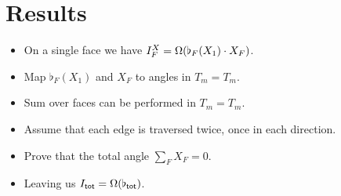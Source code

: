 \section{Results}


\begin{frame}
\begin{itemize}
\item On a single face we have \( I^X_F=\Omega(\flat_F(X_1)\cdot X_F) \).
\item Map \( \flat_F(X_1) \) and \( X_F \) to angles in \( T_m=T_m \).
\item Sum over faces can be performed in \( T_m=T_m \).
\item Assume that each edge is traversed twice, once in each direction.
\item Prove that the total angle \( \sum_F X_F=0 \).
\item Leaving us \( I_{\mathsf{tot}}=\Omega(\flat_{\mathsf{tot}}) \).
\end{itemize}
\end{frame}

